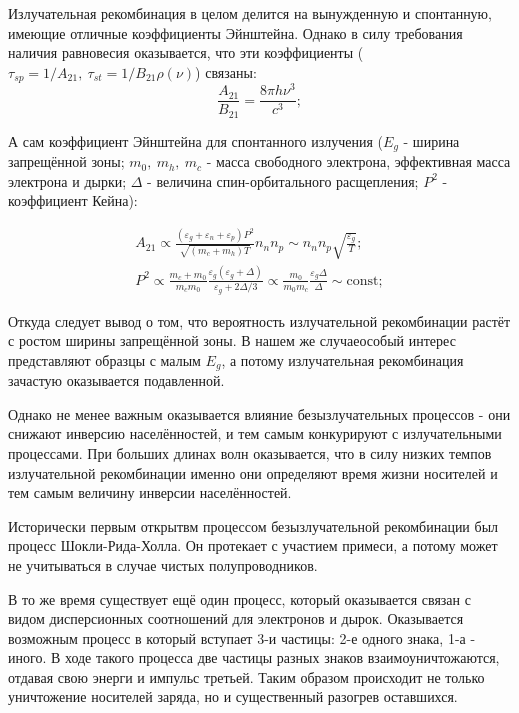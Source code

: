 \documentclass[../main.tex]{subfiles}
\begin{document}
    Излучательная рекомбинация в целом делится на вынужденную и спонтанную, имеющие
    отличные коэффициенты Эйнштейна. Однако в силу требования наличия равновесия 
    оказывается, что эти коэффициенты 
    ($\tau_{sp} = 1 / A_{21},~\tau_{st} = 1/B_{21} \rho(\nu)$) связаны:
    \begin{equation*}
        \frac{A_{21}}{B_{21}} = \frac{8\pi h \nu^3}{c^3};
    \end{equation*}

    А сам коэффициент Эйнштейна для спонтанного излучения 
    ($E_g$ - ширина запрещённой зоны; $m_0,~m_h,~m_c$ - масса свободного электрона,
    эффективная масса электрона и дырки; $\Delta$ - величина спин-орбитального 
    расщепления; $P^2$ - коэффициент Кейна): 

    \begin{eqnarray*}
        A_{21} \propto \frac{(\varepsilon_g + \varepsilon_n + \varepsilon_p) P^2}
            {\sqrt{(m_c + m_h)T}} n_n n_p \sim n_n n_p \sqrt{\frac{\varepsilon_g}{T}} ;\\
        P^2 \propto \frac{m_c + m_0}{m_c m_0} \frac{\varepsilon_g(\varepsilon_g + \Delta)}
            {\varepsilon_g + 2 \Delta / 3} \propto \frac{m_0}{m_0 m_c} \frac{\varepsilon_g \Delta}{\Delta} \sim \text{const};
    \end{eqnarray*} 

    Откуда следует вывод о том, что вероятность излучательной рекомбинации растёт
    с ростом ширины запрещённой зоны. В нашем же случаеособый интерес представляют
    образцы с малым $E_g$, а потому излучательная рекомбинация зачастую оказывается
    подавленной.

    Однако не менее важным оказывается влияние безызлучательных процессов - они снижают
    инверсию населённостей, и тем самым конкурируют с излучательными процессами. При больших 
    длинах волн оказывается, что в силу низких темпов излучательной рекомбинации именно они
    определяют время жизни носителей и тем самым величину инверсии населённостей.

    Исторически первым открытвм процессом безызлучательной рекомбинации был процесс 
    Шокли-Рида-Холла. Он протекает с участием примеси, а потому может не учитываться 
    в случае чистых полупроводников.

    В то же время существует ещё один процесс, который оказывается связан с видом дисперсионных
    соотношений для электронов и дырок. Оказывается возможным процесс в который вступает
    3-и частицы: 2-е одного знака, 1-а - иного. В ходе такого процесса две частицы разных знаков
    взаимоуничтожаются, отдавая свою энерги и импульс третьей. Таким образом происходит не только
    уничтожение носителей заряда, но и существенный разогрев оставшихся. 
\end{document}
